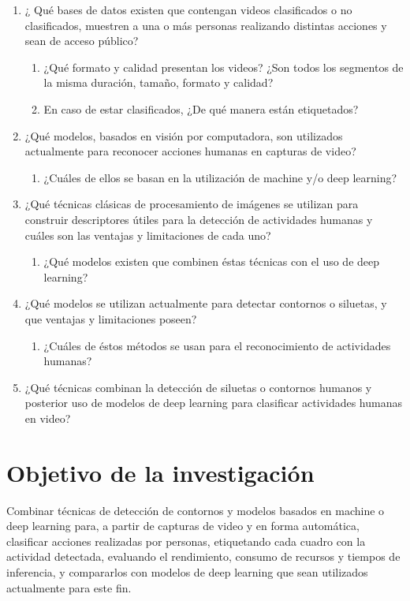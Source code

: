 \begin{enumerate}
	\item ¿ Qué bases de datos existen que contengan videos clasificados o no clasificados, muestren a una o más personas realizando distintas acciones y sean de acceso público?
	\begin{enumerate}
		\item ¿Qué formato y calidad presentan los videos? ¿Son todos los segmentos de la misma duración, tamaño, formato y calidad?
		\item En caso de estar clasificados, ¿De qué manera están etiquetados?
	\end{enumerate}
	\item ¿Qué modelos, basados en visión por computadora, son utilizados actualmente para reconocer acciones humanas en capturas de video?
	\begin{enumerate}
		\item ¿Cuáles de ellos se basan en la utilización de machine y/o deep learning?
	\end{enumerate}
	\item ¿Qué técnicas clásicas de procesamiento de imágenes se utilizan para construir descriptores útiles para la detección de actividades humanas y cuáles son las ventajas y limitaciones de cada uno? 
	\begin{enumerate}
		\item ¿Qué modelos existen que combinen éstas técnicas con el uso de deep learning?
	\end{enumerate}
	\item ¿Qué modelos se utilizan actualmente para detectar contornos o siluetas, y que ventajas y limitaciones poseen?
	\begin{enumerate}
		\item ¿Cuáles de éstos métodos se usan para el reconocimiento de actividades humanas?
	\end{enumerate}
	\item ¿Qué técnicas combinan la detección de siluetas o contornos humanos y posterior uso de modelos de deep learning para clasificar actividades humanas en video?
\end{enumerate}

\section{Objetivo de la investigación}

Combinar técnicas de detección de contornos y modelos basados en machine o deep learning para, a partir de capturas de video y en forma automática, clasificar acciones realizadas por personas, etiquetando cada cuadro con la actividad detectada, evaluando el rendimiento, consumo de recursos y tiempos de inferencia, y compararlos con modelos de deep learning que sean utilizados actualmente para este fin.


